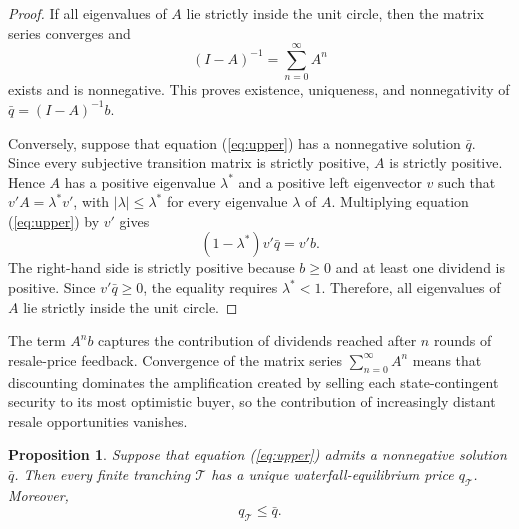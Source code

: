\documentclass[11pt]{article}
\theoremstyle{plain}
\newtheorem{prp}{Proposition}%
\begin{document}
\begin{proof}
If all eigenvalues of $A$ lie strictly inside the unit circle, then the matrix series converges and
\[
(I-A)^{-1}=\sum_{n=0}^{\infty}A^n
\]
exists and is nonnegative. This proves existence, uniqueness, and nonnegativity of $\bar q=(I-A)^{-1}b$.

Conversely, suppose that equation (\ref{eq:upper}) has a nonnegative solution $\bar q$. Since every subjective transition matrix is strictly positive, $A$ is strictly positive. Hence $A$ has a positive eigenvalue $\lambda^*$ and a positive left eigenvector $v$ such that $v'A=\lambda^*v'$, with $|\lambda|\leq\lambda^*$ for every eigenvalue $\lambda$ of $A$. Multiplying equation (\ref{eq:upper}) by $v'$ gives
\[
(1-\lambda^*)v'\bar q=v'b.
\]
The right-hand side is strictly positive because $b\geq0$ and at least one dividend is positive. Since $v'\bar q\geq0$, the equality requires $\lambda^*<1$. Therefore, all eigenvalues of $A$ lie strictly inside the unit circle.
\end{proof}

The term $A^n b$ captures the contribution of dividends reached after $n$ rounds of resale-price feedback. Convergence of the matrix series $\sum_{n=0}^{\infty}A^n$ means that discounting dominates the amplification created by selling each state-contingent security to its most optimistic buyer, so the contribution of increasingly distant resale opportunities vanishes.

\begin{prp}\label{prp:upper}
Suppose that equation (\ref{eq:upper}) admits a nonnegative solution $\bar q$. Then every finite tranching $\mathcal{T}$ has a unique waterfall-equilibrium price $q_{\mathcal{T}}$. Moreover,
\[
q_{\mathcal{T}}\leq\bar q.
\]
\end{prp}
\end{document}
